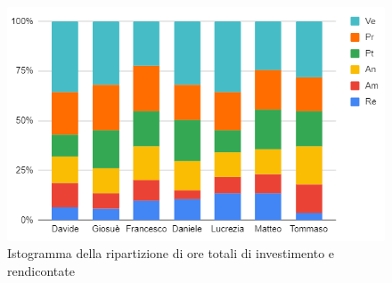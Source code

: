 \begin{figure}[H]
    \centering
    \includegraphics[scale = 0.5]{components/img/totale_isto.png}
    \caption{ Istogramma della ripartizione di ore totali di investimento e rendicontate}
    \label{fig:Istogramma ripartizione ore totali di investimento e rendicontate }
\end{figure}
